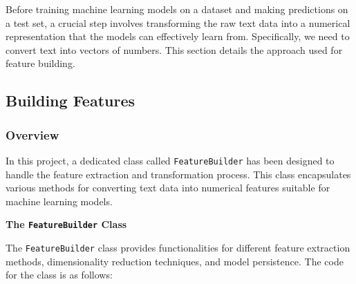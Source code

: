 Before training machine learning models on a dataset and making predictions on a test set, a crucial step involves transforming the raw text data into a numerical representation that the models can effectively learn from. Specifically, we need to convert text into vectors of numbers. This section details the approach used for feature building.

\subsection{Building Features}

\subsubsection{Overview}

In this project, a dedicated class called \texttt{FeatureBuilder} has been designed to handle the feature extraction and transformation process. This class encapsulates various methods for converting text data into numerical features suitable for machine learning models.

\textbf{The \texttt{FeatureBuilder} Class}

The \texttt{FeatureBuilder} class provides functionalities for different feature extraction methods, dimensionality reduction techniques, and model persistence. The code for the class is as follows:

